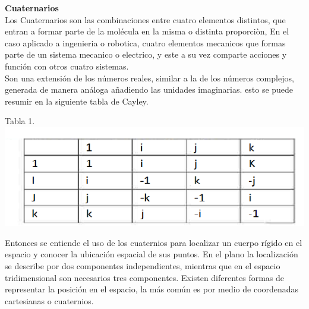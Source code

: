 \documentclass[12pt,a4paper]{report}
\begin{document}
\textbf{Cuaternarios}\\
Los Cuaternarios son las combinaciones entre cuatro elementos distintos, que entran a formar parte de la molécula en la misma o distinta proporciòn, En el caso aplicado a ingenieria o robotica, cuatro elementos mecanicos que formas parte de un sistema mecanico o electrico, y este a su vez comparte acciones y función con otros cuatro sistemas.
\\
Son una extensión de los números reales, similar a la de los números complejos, generada de manera análoga añadiendo las unidades imaginarias.
esto se puede resumir en la siguiente tabla de Cayley.
\begin{center}
Tabla 1.\\
\includegraphics[scale=1]{Imagenes/imagen4.png} 
\end{center}
Entonces se entiende el uso de los cuaternios para localizar un cuerpo rígido en el espacio y conocer la ubicación espacial de sus puntos. En el plano la localización se describe por dos componentes independientes, mientras que en el espacio tridimensional son necesarios tres componentes. Existen diferentes formas de representar la posición en el espacio, la más común es por medio de coordenadas cartesianas o cuaternios.
\\
\end{document}
